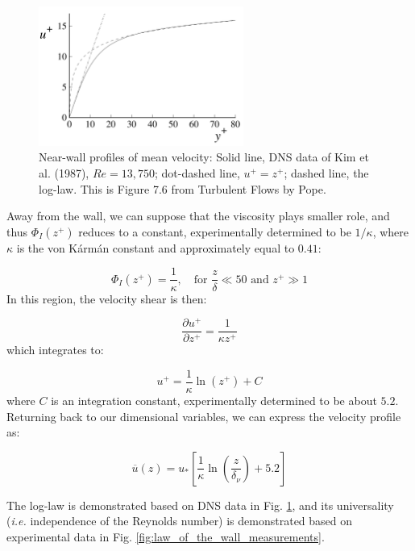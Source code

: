 \documentclass[12pt]{article}
\numberwithin{equation}{section}
\numberwithin{figure}{section}
\numberwithin{table}{section}
\begin{document}
\begin{figure}[h]
  \centering
  \includegraphics[width=0.6\textwidth]{assets/fig_law_of_the_wall_loglaw.png}
  \caption{
    Near-wall profiles of mean velocity:
    Solid line, DNS data of Kim et al. (1987), $Re = 13,750$;
    dot-dashed line, $u^+ = z^+$; dashed line, the log-law.
    This is Figure 7.6 from Turbulent Flows by Pope.
  }
  \label{fig:law_of_the_wall_loglaw}
\end{figure}

Away from the wall, we can suppose that the viscosity plays smaller role, and
thus $\Phi_I(z^+)$ reduces to a constant, experimentally determined to be
$1/\kappa$, where $\kappa$ is the von Kármán constant and approximately equal to
$0.41$:

\begin{equation}
  \Phi_I(z^+) = \frac{1}{\kappa}, \quad \text{for } \frac{z}{\delta} \ll 50   \text{ and } z^+ \gg 1
\end{equation}
In this region, the velocity shear is then:

\begin{equation}
  \frac{\partial u^+}{\partial z^+} = \frac{1}{\kappa z^+}
\end{equation}
which integrates to:

\begin{equation}
  u^+ = \frac{1}{\kappa} \ln(z^+) + C
  \label{eq:law_of_the_wall_loglaw}
\end{equation}
where $C$ is an integration constant, experimentally determined to be about $5.2$.
Returning back to our dimensional variables, we can express the velocity profile
as:

\begin{equation}
  \overline{u}(z) = u_* \left[ \frac{1}{\kappa} \ln\left(\frac{z}{\delta_\nu}\right) + 5.2 \right]
  \label{eq:law_of_the_wall_loglaw_dim}
\end{equation}

The log-law is demonstrated based on DNS data in Fig. \ref{fig:law_of_the_wall_loglaw},
and its universality (\textit{i.e.} independence of the Reynolds number) is
demonstrated based on experimental data in Fig. \ref{fig:law_of_the_wall_measurements}.
\end{document}
